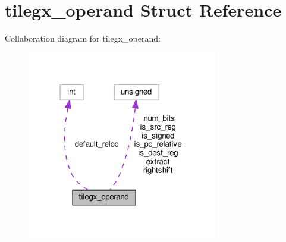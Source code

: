\hypertarget{structtilegx__operand}{}\section{tilegx\+\_\+operand Struct Reference}
\label{structtilegx__operand}


Collaboration diagram for tilegx\+\_\+operand\+:
\nopagebreak
\begin{figure}[H]
\begin{center}
\leavevmode
\includegraphics[width=235pt]{structtilegx__operand__coll__graph}
\end{center}
\end{figure}
